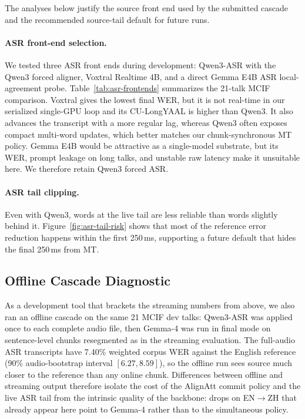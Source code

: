 \documentclass[11pt]{article}
\begin{document}
The analyses below justify the source front end used by the submitted cascade
and the recommended source-tail default for future runs.

\paragraph{ASR front-end selection.}
We tested three ASR front ends during development: Qwen3-ASR with the Qwen3
forced aligner, Voxtral Realtime 4B, and a direct Gemma E4B ASR local-agreement
probe. Table~\ref{tab:asr-frontends} summarizes the 21-talk MCIF comparison.
Voxtral gives the lowest final WER, but it is not real-time in our serialized
single-GPU loop and its CU-LongYAAL is higher than Qwen3. It also advances the
transcript with a more regular lag, whereas Qwen3 often exposes compact
multi-word updates, which better matches our chunk-synchronous MT policy.
Gemma E4B would be attractive as a single-model substrate, but its WER, prompt
leakage on long talks, and unstable raw latency make it unsuitable here. We
therefore retain Qwen3 forced ASR.



\paragraph{ASR tail clipping.}
Even with Qwen3, words at the live tail are less reliable than words slightly
behind it. Figure~\ref{fig:asr-tail-risk} shows that most of the reference
error reduction happens within the first 250\,ms, supporting a future default
that hides the final 250\,ms from MT.

\subsection{Offline Cascade Diagnostic}
\label{sec:appendix-offline}
As a development tool that brackets the streaming numbers from above, we also
ran an offline cascade on the same 21 MCIF dev talks: Qwen3-ASR was applied
once to each complete audio file, then Gemma-4 was run in final mode on
sentence-level chunks resegmented as in the streaming evaluation. The full-audio ASR transcripts have 7.40\% weighted
corpus WER against the English reference (90\% audio-bootstrap interval
$[6.27, 8.59]$), so the offline run sees source much closer to the reference
than any online chunk. Differences between offline and streaming output
therefore isolate the cost of the AlignAtt commit policy and the live ASR tail
from the intrinsic quality of the backbone: drops on EN$\to$ZH that already
appear here point to Gemma-4 rather than to the simultaneous policy.
\end{document}
